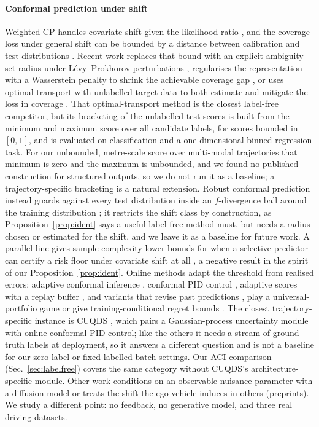 \paragraph{Conformal prediction under shift}
Weighted CP handles covariate shift given the likelihood ratio \cite{tibshirani2019covariate}, and the coverage loss
under general shift can be bounded by a distance between calibration and test distributions \cite{barber2023beyond}.
Recent work replaces that bound with an explicit ambiguity-set radius under L\'{e}vy--Prokhorov perturbations
\cite{aolaritei2025levy}, regularises the representation with a Wasserstein penalty to shrink the achievable coverage
gap \cite{xu2025wasserstein}, or uses optimal transport with unlabelled target data to both estimate and mitigate the
loss in coverage \cite{correia2025nonexchangeable}. That optimal-transport method is the closest label-free competitor,
but its bracketing of the unlabelled test scores is built from the minimum and maximum score over all candidate labels,
for scores bounded in $[0,1]$, and is evaluated on classification and a one-dimensional binned regression task. For our
unbounded, metre-scale score over multi-modal trajectories that minimum is zero and the maximum is unbounded, and we
found no published construction for structured outputs, so we do not run it as a baseline; a trajectory-specific
bracketing is a natural extension. Robust conformal prediction instead guards against every test distribution inside
an $f$-divergence ball around the training distribution \cite{cauchois2024robust}; it restricts the shift class by
construction, as Proposition~\ref{prop:ident} says a useful label-free method must, but needs a radius chosen or
estimated for the shift, and we leave it as a baseline for future work. A parallel line gives sample-complexity lower bounds for when a selective predictor can certify a risk floor under covariate
shift at all \cite{liu2026certify}, a negative result in the spirit of our Proposition~\ref{prop:ident}. Online methods adapt
the threshold from realised errors: adaptive conformal inference \cite{gibbs2021adaptive}, conformal PID control
\cite{angelopoulos2023pid}, adaptive scores with a replay buffer \cite{tumu2026adaptnc}, and variants that revise past
predictions \cite{jun2026retrospective}, play a universal-portfolio game \cite{liu2026portfolio} or give training-conditional
regret bounds \cite{liang2026optimalregret}. The closest trajectory-specific instance is CUQDS \cite{huang2025cuqds}, which pairs a
Gaussian-process uncertainty module with online conformal PID control; like the others it needs a stream of ground-truth labels
at deployment, so it answers a different question and is not a baseline for our zero-label or fixed-labelled-batch settings.
Our ACI comparison (Sec.~\ref{sec:labelfree}) covers the same category without CUQDS's architecture-specific module. Other work
conditions on an observable nuisance parameter with a diffusion model \cite{rahaman2026shift} or treats the shift the ego vehicle
induces in others \cite{binny2025moved} (preprints). We study a different point: no feedback, no generative model, and three
real driving datasets.

